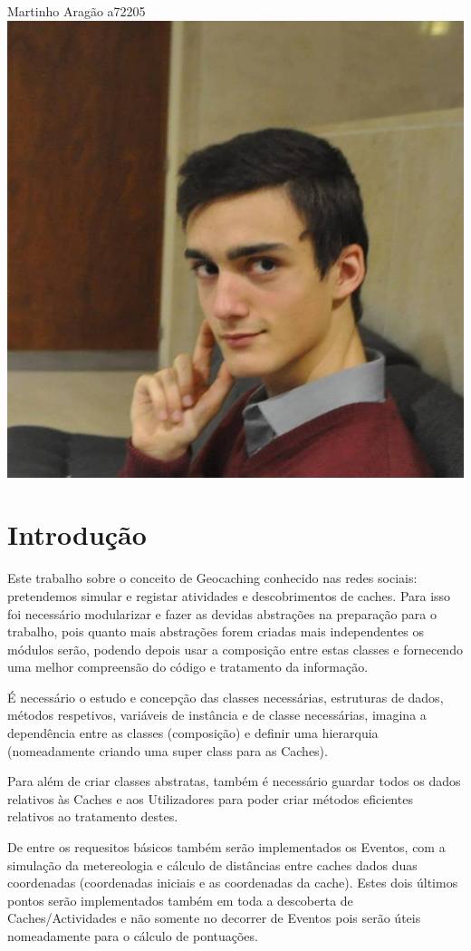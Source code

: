 \documentclass{article}
\begin{document}
\begin{center}
Martinho Aragão a72205 \\
\includegraphics[height=3\baselineskip,natwidth=369,natheight=430]{martinho.jpg}
\end{center}

\pagebreak


\tableofcontents

\pagebreak

\section{Introdução}

\quad
Este trabalho sobre o conceito de Geocaching conhecido nas redes sociais: pretendemos simular
e registar atividades e descobrimentos de caches. Para isso foi necessário modularizar e fazer
as devidas abstrações na preparação para o trabalho, pois quanto mais abstrações forem criadas
mais independentes os módulos serão, podendo depois usar a composição entre estas classes e
fornecendo uma melhor compreensão do código e tratamento da informação.
\par
É necessário o estudo e concepção das classes necessárias, estruturas de dados, métodos
respetivos, variáveis de instância e de classe necessárias, imagina a dependência entre
as classes (composição) e definir uma hierarquia (nomeadamente criando uma super
class para as Caches).
\par Para além de criar classes abstratas, também é necessário guardar todos os dados relativos
às Caches e aos Utilizadores para poder criar métodos eficientes relativos ao tratamento
destes.
\par De entre os requesitos básicos também serão implementados os Eventos, com a simulação
da metereologia e cálculo de distâncias entre caches dados duas coordenadas (coordenadas
iniciais e as coordenadas da cache). Estes dois últimos pontos serão implementados também
em toda a descoberta de Caches/Actividades e não somente no decorrer de Eventos pois serão
úteis nomeadamente para o cálculo de pontuações.
\pagebreak
\end{document}
